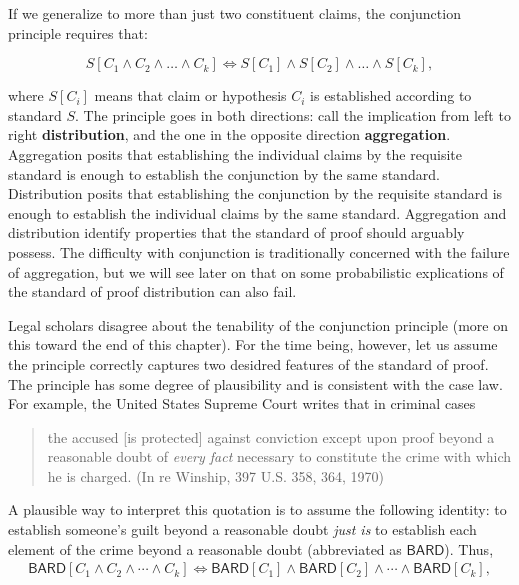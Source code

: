 \documentclass[
  10pt,
  dvipsnames,enabledeprecatedfontcommands]{scrartcl}
\begin{document}
\noindent If we generalize to more than just two constituent claims, the
conjunction principle requires that:

\[S[C_1 \wedge C_2  \wedge \dots \wedge  C_k] \Leftrightarrow S[C_1] \wedge S[C_2]  \wedge \dots \wedge  S[C_k],\]

\noindent where \(S[C_i]\) means that claim or hypothesis \(C_i\) is
established according to standard \(S\). The principle goes in both
directions: call the implication from left to right
\textbf{distribution}, and the one in the opposite direction
\textbf{aggregation}. Aggregation posits that establishing the
individual claims by the requisite standard is enough to establish the
conjunction by the same standard. Distribution posits that establishing
the conjunction by the requisite standard is enough to establish the
individual claims by the same standard. Aggregation and distribution
identify properties that the standard of proof should arguably possess.
The difficulty with conjunction is traditionally concerned with the
failure of aggregation, but we will see later on that on some
probabilistic explications of the standard of proof distribution can
also fail.

Legal scholars disagree about the tenability of the conjunction
principle (more on this toward the end of this chapter). For the time
being, however, let us assume the principle correctly captures two
desidred features of the standard of proof. The principle has some
degree of plausibility and is consistent with the case law. For example,
the United States Supreme Court writes that in criminal cases

\begin{quote}
the accused [is protected] against conviction except upon proof beyond a reasonable doubt of \textit{every fact} necessary to constitute the crime with which he is charged. \linebreak 
(In re Winship, 397 U.S. 358, 364, 1970)
\end{quote}

\noindent A plausible way to interpret this quotation is to assume the
following identity: to establish someone's guilt beyond a reasonable
doubt \textit{just is} to establish each element of the crime beyond a
reasonable doubt (abbreviated as \(\mathsf{BARD}\)). Thus,
\begin{align*}\mathsf{BARD}[C_1 \wedge C_2   \wedge \cdots \wedge C_k] \Leftrightarrow \mathsf{BARD}[C_1] \wedge \mathsf{BARD}[C_2]  \wedge \cdots \wedge \mathsf{BARD}[C_k],
\end{align*}
\end{document}
